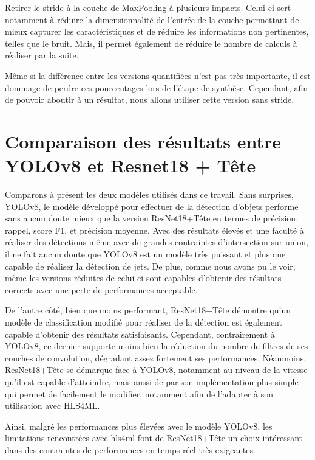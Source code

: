 \break

Retirer le stride à la couche de MaxPooling à plusieurs impacts. Celui-ci sert notamment à réduire la dimensionnalité de l'entrée de la couche permettant de mieux capturer les caractéristiques et de réduire les informations non pertinentes, telles que le bruit. Mais, il permet également de réduire le nombre de calculs à réaliser par la suite.

Même si la différence entre les versions quantifiées n'est pas très importante, il est dommage de perdre ces pourcentages lors de l'étape de synthèse. Cependant, afin de pouvoir aboutir à un résultat, nous allons utiliser cette version sans stride.

\section{Comparaison des résultats entre YOLOv8 et Resnet18 + Tête}

Comparons à présent les deux modèles utilisés dans ce travail. Sans surprises, YOLOv8, le modèle développé pour effectuer de la détection d'objets performe sans aucun doute mieux que la version ResNet18+Tête en termes de précision, rappel, score F1, et précision moyenne. Avec des résultats élevés et une faculté à réaliser des détections même avec de grandes contraintes d'intersection sur union, il ne fait aucun doute que YOLOv8 est un modèle très puissant et plus que capable de réaliser la détection de jets. De plus, comme nous avons pu le voir, même les versions réduites de celui-ci sont capables d'obtenir des résultats corrects avec une perte de performances acceptable.

De l'autre côté, bien que moins performant, ResNet18+Tête démontre qu'un modèle de classification modifié pour réaliser de la détection est également capable d'obtenir des résultats satisfaisants. Cependant, contrairement à YOLOv8, ce dernier supporte moins bien la réduction du nombre de filtres de ses couches de convolution, dégradant assez fortement ses performances. Néanmoins, ResNet18+Tête se démarque face à YOLOv8, notamment au niveau de la vitesse qu'il est capable d'atteindre, mais aussi de par son implémentation plus simple qui permet de facilement le modifier, notamment afin de l'adapter à son utilisation avec HLS4ML.

Ainsi, malgré les performances plus élevées avec le modèle YOLOv8, les limitations rencontrées avec \acrshort{hls4ml} font de ResNet18+Tête un choix intéressant dans des contraintes de performances en temps réel très exigeantes.

